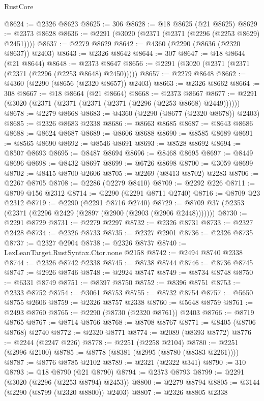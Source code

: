 \begin{lexlean}{RustCore}
\begin{coremodule}
@8624 := @2326 @8623
@8625 := 306
@8628 := @18 @8625 (@21 @8625)
@8629 := @2373 @8628
@8636 := @2291 (@3020 (@2371 (@2371 (@2296 (@2253 @8629) @2451))))
@8637 := @2279 @8629
@8642 := @4360 (@2290 (@8636 (@2320 @8637)) @2403)
@8643 := @2326 @8642
@8644 := 307
@8647 := @18 @8644 (@21 @8644)
@8648 := @2373 @8647
@8656 := @2291 (@3020 (@2371 (@2371 (@2371 (@2296 (@2253 @8648) @2450)))))
@8657 := @2279 @8648
@8662 := @4360 (@2290 (@8656 (@2320 @8657)) @2403)
@8663 := @2326 @8662
@8664 := 308
@8667 := @18 @8664 (@21 @8664)
@8668 := @2373 @8667
@8677 := @2291 (@3020 (@2371 (@2371 (@2371 (@2371 (@2296 (@2253 @8668) @2449))))))
@8678 := @2279 @8668
@8683 := @4360 (@2290 (@8677 (@2320 @8678)) @2403)
@8685 := @2326 @8683 @2338
@8686 := @8663 @8685
@8687 := @8643 @8686
@8688 := @8624 @8687
@8689 := @8606 @8688
@8690 := @8585 @8689
@8691 := @8565 @8690
@8692 := @8546 @8691
@8693 := @8528 @8692
@8694 := @8507 @8693
@8695 := @8487 @8694
@8696 := @8468 @8695
@8697 := @8449 @8696
@8698 := @8432 @8697
@8699 := @6726 @8698
@8700 := @3059 @8699
@8702 := @8415 @8700 @2606
@8705 := @2269 (@8413 @8702) @2283
@8706 := @2267 @8705
@8708 := @2286 (@2279 @8410)
@8709 := @2292 @226
@8711 := @8709 @156 @2312
@8714 := @2290 (@2291 @8711 @2740)
@8716 := @8709 @23 @2312
@8719 := @2290 (@2291 @8716 @2740)
@8729 := @8709 @37 (@2353 (@2371 (@2296 @2429 (@2897 (@2900 (@2903 (@2906 @2448)))))))
@8730 := @2291 @8729
@8731 := @2279 @2297
@8732 := @2326 @8731
@8733 := @2327 @2428
@8734 := @2326 @8733
@8735 := @2327 @2901
@8736 := @2326 @8735
@8737 := @2327 @2904
@8738 := @2326 @8737
@8740 := LexLeanTarget.RustSyntax.Ctor.none @2158
@8742 := @2494 @8740 @2338
@8744 := @2326 @8742 @2338
@8745 := @8738 @8744
@8746 := @8736 @8745
@8747 := @2926 @8746
@8748 := @2924 @8747
@8749 := @8734 @8748
@8750 := @6331 @8749
@8751 := @8397 @8750
@8752 := @8396 @8751
@8753 := @2333 @8752
@8754 := @3061 @8753
@8755 := @8732 @8754
@8757 := @5650 @8755 @2606
@8759 := @2326 @8757 @2338
@8760 := @5648 @8759
@8761 := @2493 @8760
@8765 := @2290 (@8730 (@2320 @8761)) @2403
@8766 := @8719 @8765
@8767 := @8714 @8766
@8768 := @8708 @8767
@8771 := @8405 (@8706 @8768) @2740
@8772 := @2320 @8771
@8774 := @2089 (@8393 @8772)
@8776 := @2244 (@2247 @226)
@8778 := @2251 (@2258 @2104)
@8780 := @2251 (@2996 @2100)
@8785 := @8778 (@8381 (@2995 (@8780 (@8383 @2261))))
@8787 := @8776 @8785 @2102
@8789 := @2321 (@2322 @341)
@8790 := 310
@8793 := @18 @8790 (@21 @8790)
@8794 := @2373 @8793
@8799 := @2291 (@3020 (@2296 (@2253 @8794) @2453))
@8800 := @2279 @8794
@8805 := @3144 (@2290 (@8799 (@2320 @8800)) @2403)
@8807 := @2326 @8805 @2338

\end{coremodule}
\end{lexlean}

